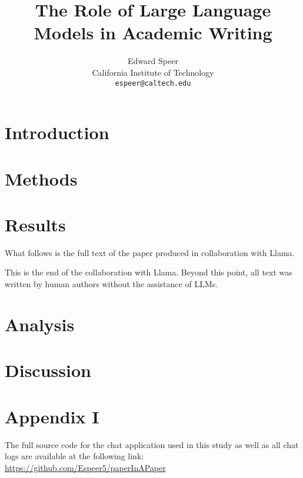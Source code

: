 \documentclass[11pt, a4paper, hyphens]{article}
\title{The Role of Large Language Models in Academic Writing}
\author{%
  Edward Speer
  \\
  California Institute of Technology\\
  \texttt{espeer@caltech.edu} \\
}
\date{\monthyeardate}
\begin{document}
\maketitle

\begin{abstract}
    
\end{abstract}

\section{Introduction}\label{sec:introduction}



\section{Methods}\label{sec:methods}



\section{Results}\label{sec:results}

What follows is the full text of the paper produced in collaboration with Llama.
\clearpage



This is the end of the collaboration with Llama. Beyond this point, all text
was written by human authors without the assistance of LLMs.

\section{Analysis}\label{sec:analysis}



\section{Discussion}\label{sec:conclusion}



\pagebreak



\section{Appendix I}\label{sec:appendixI}

The full source code for the chat application used in this study as well as all
chat logs are available at the following link: 
\url{https://github.com/Espeer5/paperInAPaper}

\pagebreak


\end{document}
